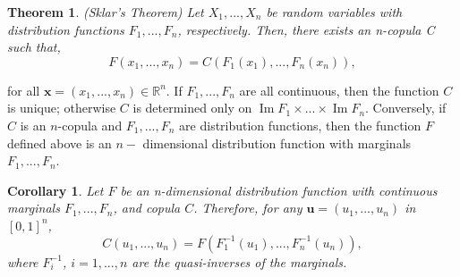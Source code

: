 \documentclass[a4paper,12pt]{report}
\newtheorem{theorem}{Theorem}
\newtheorem{corollary}{Corollary}[theorem]
\DeclareMathOperator{\Ima}{Im}
\begin{document}
\begin{refsection}
\bigskip

\begin{theorem}
	(Sklar's Theorem) Let $X_{1},...,X_{n}$ be random variables with
	distribution functions $F_{1},...,F_{n}$, respectively. Then, there exists
	an n-copula C such that,
	\begin{equation}
	F\left( x_{1},...,x_{n}\right) =C\left( F_{1}\left( x_{1}\right)
	,...,F_{n}\left( x_{n}\right) \right) ,  \label{21} 
	\end{equation}
\end{theorem} 
\noindent for all $\mathbf{x}=\left( x_{1},...,x_{n}\right) \in
\mathbb{R}
^{n}$. If $F_{1},...,F_{n}$ are all continuous, then the function $C$ is
unique; otherwise $C$ is determined only on $\Ima F_{1}\times ...\times \Ima %
F_{n}$. Conversely, if $C$ is an $n$-copula and $F_{1},...,F_{n}$ are
distribution functions, then the function $F$ defined above is an $n-$%
dimensional distribution function with marginals $F_{1},...,F_{n}$.

\bigskip

\begin{corollary}
	Let $F$ be an n-dimensional distribution function with continuous marginals $%
	F_{1},...,F_{n}$, and copula $C$. Therefore, for any $\mathbf{u}=\left(
	u_{1},...,u_{n}\right) $ in $\left[ 0,1\right] ^{n}$,
	\begin{equation}
	C\left( u_{1},...,u_{n}\right) =F\left( F_{1}^{-1}\left( u_{1}\right)
	,...,F_{n}^{-1}\left( u_{n}\right) \right) ,  \label{22}
	\end{equation}
	where $F_{i}^{-1}$, $i=1,...,n$ are the quasi-inverses of the marginals.
\end{corollary}


\end{refsection}
\end{document}
